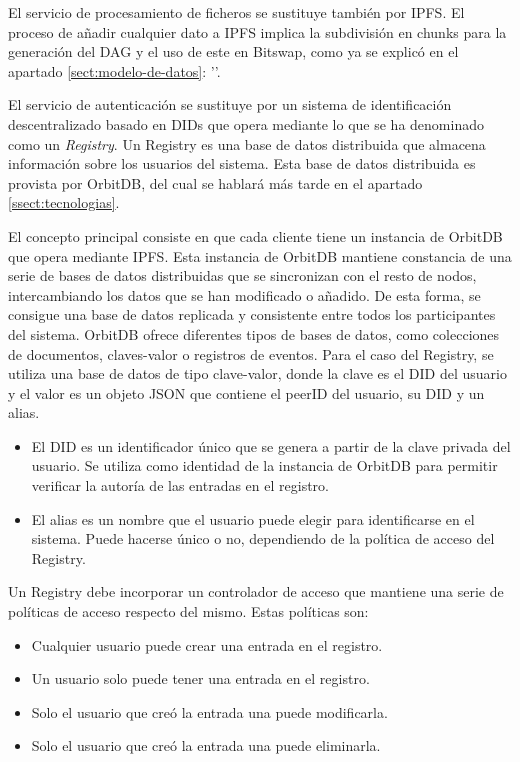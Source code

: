 El servicio de procesamiento de ficheros se sustituye también por IPFS. El proceso de añadir cualquier dato a IPFS implica la subdivisión en chunks
para la generación del DAG y el uso de este en Bitswap, como ya se explicó en el apartado \ref{sect:modelo-de-datos}: ''.

El servicio de autenticación se sustituye por un sistema de identificación descentralizado basado en DIDs que opera mediante
lo que se ha denominado como un \textit{Registry}. Un Registry es una base de datos distribuida que almacena información sobre los usuarios del sistema.
Esta base de datos distribuida es provista por OrbitDB, del cual se hablará más tarde en el apartado \ref{ssect:tecnologias}.

El concepto principal consiste
en que cada cliente tiene un instancia de OrbitDB que opera mediante IPFS. Esta instancia de OrbitDB mantiene constancia de una serie de bases de datos distribuidas que se sincronizan
con el resto de nodos, intercambiando los datos que se han modificado o añadido. De esta forma, se consigue una base de datos replicada y consistente entre todos los participantes del
sistema. OrbitDB ofrece diferentes tipos de bases de datos, como colecciones de documentos, claves-valor o registros de eventos. Para el caso del Registry, se utiliza una base de
datos de tipo clave-valor, donde la clave es el DID del usuario y el valor es un objeto JSON que contiene el peerID del usuario, su DID y un alias.
\begin{itemize}[noitemsep,after=\vspace{-0.4\baselineskip}]
  \item El DID es un identificador único que se genera a partir de la clave privada del usuario.
        Se utiliza como identidad de la instancia de OrbitDB para permitir verificar la autoría de las entradas en el registro.
  \item El alias es un nombre que el usuario puede elegir para identificarse en el sistema. Puede hacerse único o no, dependiendo de la política de acceso del Registry.
\end{itemize}

Un Registry debe incorporar un controlador de acceso que mantiene una serie de políticas de acceso respecto del mismo.
Estas políticas son:
\begin{itemize}[noitemsep,after=\vspace{-0.4\baselineskip}]
  \item Cualquier usuario puede crear una entrada en el registro.
  \item Un usuario solo puede tener una entrada en el registro.
  \item Solo el usuario que creó la entrada una puede modificarla.
  \item Solo el usuario que creó la entrada una puede eliminarla.
\end{itemize}


